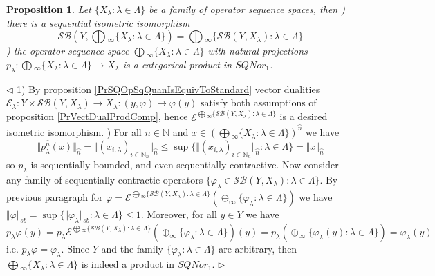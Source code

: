 \documentclass[12pt]{article}
\newtheorem{proposition}[theorem]{Proposition}
\newenvironment{proof}{\par $\triangleleft$}{$\triangleright$}
\begin{document}
\begin{proposition}\label{PrSQProdUnivProp} Let $\{X_\lambda:\lambda\in \Lambda\}$ be a family of operator sequence spaces, then
) there is a sequential isometric isomorphism
$$
\mathcal{SB}\left(Y,\bigoplus{}_\infty\{X_\lambda:\lambda\in\Lambda\}\right)
=\bigoplus{}_\infty\{\mathcal{SB}(Y,X_\lambda):\lambda\in\Lambda\}
$$
) the operator sequence space $\bigoplus{}_\infty\{X_\lambda:\lambda\in\Lambda\}$ with natural projections $p_\lambda:\bigoplus{}_\infty\{X_\lambda:\lambda\in\Lambda\}\to X_\lambda$ is a categorical product in $SQNor_1$.
\end{proposition}
\begin{proof} 1) By proposition \ref{PrSQOpSqQuanIsEquivToStandard} vector dualities $\mathcal{E}_\lambda:Y\times\mathcal{SB}(Y,X_\lambda)\to X_\lambda:(y,\varphi)\mapsto \varphi(y)$ satisfy both assumptions of proposition \ref{PrVectDualProdComp}, hence $\mathcal{E}^{\bigoplus{}_\infty\{\mathcal{SB}(Y,X_\lambda):\lambda\in\Lambda\}}$ is a desired isometric isomorphism.
) For all $n\in\mathbb{N}$ and $x\in \left(\bigoplus{}_\infty\{X_\lambda:\lambda\in\Lambda\}\right)^{\wideparen{n}}$ we have
$$
\Vert p_\lambda^{\wideparen{n}}(x)\Vert_{\wideparen{n}}
=\Vert (x_{i,\lambda})_{i\in\mathbb{N}_n}\Vert_{\wideparen{n}}
\leq\sup\{\Vert (x_{i,\lambda})_{i\in\mathbb{N}_n}\Vert_{\wideparen{n}}:\lambda\in \Lambda\}
=\Vert x\Vert_{\wideparen{n}}
$$
so $p_\lambda$ is sequentially bounded, and even sequentially contractive. Now consider any family of sequentially contractie operators $\{\varphi_\lambda\in\mathcal{SB}(Y,X_\lambda):\lambda\in\Lambda\}$. By previous paragraph for  $\varphi=\mathcal{E}^{\bigoplus{}_\infty\{\mathcal{SB}(Y,X_\lambda):\lambda\in\Lambda\}}(\oplus_\infty\{\varphi_\lambda:\lambda\in\Lambda\})$ we have $\Vert\varphi\Vert_{sb}=\sup\{\Vert\varphi_\lambda\Vert_{sb}:\lambda\in\Lambda\}\leq 1$. Moreover, for all $y\in Y$ we have
$$
p_\lambda\varphi(y)
=p_\lambda\mathcal{E}^{\bigoplus{}_\infty\{\mathcal{SB}(Y,X_\lambda):\lambda\in\Lambda\}}(\oplus_\infty\{\varphi_\lambda:\lambda\in\Lambda\})(y)
=p_\lambda(\oplus_\infty\{\varphi_\lambda(y):\lambda\in\Lambda\})=\varphi_\lambda(y)
$$
i.e. $p_\lambda\varphi=\varphi_\lambda$. Since $Y$ and the family $\{\varphi_\lambda:\lambda\in\Lambda\}$ are arbitrary, then $\bigoplus{}_\infty\{X_\lambda:\lambda\in\Lambda\}$ is indeed a product in $SQNor_1$.
\end{proof}
\end{document}

